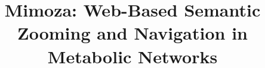 \documentclass{bmcart}
\begin{document}
\begin{frontmatter}

\begin{fmbox}


\title{Mimoza: Web-Based Semantic Zooming and Navigation in Metabolic Networks}


\author[
   addressref={aff1},                   %
   corref={aff1},                       %
   email={anna.zhukova@inria.fr}   %
]{ }
\author[
   addressref={aff1},
   email={david.sherman@inria.fr}
]{ }


\address[id=aff1]{%
  , %
  ,                     %
  ,                              %
}


\end{fmbox}
\end{frontmatter}
\end{document}
